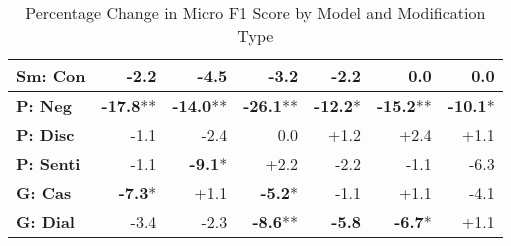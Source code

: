 \begin{table}[h]
\begin{tabular}{lrrrrrr}
\textbf{Sm: Con} & \cellcolor{red!6} -2.2 & \cellcolor{red!13} -4.5 & \cellcolor{red!9} -3.2 & \cellcolor{red!6} -2.2 & \cellcolor{red!0} 0.0 & \cellcolor{red!0} 0.0 \\
\hline
\textbf{P: Neg} & \cellcolor{red!30} \textbf{-17.8}** & \cellcolor{red!30} \textbf{-14.0}** & \cellcolor{red!30} \textbf{-26.1}** & \cellcolor{red!30} \textbf{-12.2}* & \cellcolor{red!30} \textbf{-15.2}** & \cellcolor{red!30} \textbf{-10.1}* \\
\textbf{P: Disc} & \cellcolor{red!3} -1.1 & \cellcolor{red!7} -2.4 & \cellcolor{red!0} 0.0 & \cellcolor{green!3} +1.2 & \cellcolor{green!7} +2.4 & \cellcolor{green!3} +1.1 \\
\textbf{P: Senti} & \cellcolor{red!3} -1.1 & \cellcolor{red!27} \textbf{-9.1}* & \cellcolor{green!6} +2.2 & \cellcolor{red!6} -2.2 & \cellcolor{red!3} -1.1 & \cellcolor{red!18} -6.3 \\
\hline
\textbf{G: Cas} & \cellcolor{red!21} \textbf{-7.3}* & \cellcolor{green!3} +1.1 & \cellcolor{red!15} \textbf{-5.2}* & \cellcolor{red!3} -1.1 & \cellcolor{green!3} +1.1 & \cellcolor{red!12} -4.1 \\
\textbf{G: Dial} & \cellcolor{red!10} -3.4 & \cellcolor{red!6} -2.3 & \cellcolor{red!25} \textbf{-8.6}** & \cellcolor{red!17} \textbf{-5.8} & \cellcolor{red!20} \textbf{-6.7}* & \cellcolor{green!3} +1.1 \\
\hline
\end{tabular}
\caption{Percentage Change in Micro F1 Score by Model and Modification Type}
\label{tab:ner_results}
\end{table}